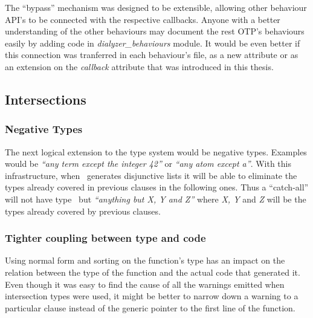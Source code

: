 The ``bypass'' mechanism was designed to be extensible, allowing other
behaviour API's to be connected with the respective callbacks. Anyone
with a better understanding of the other behaviours may document the
rest OTP's behaviours easily by adding code in
\emph{dialyzer\_behaviours} module. It would be even better if this
connection was tranferred in each behaviour's file, as a new attribute
or as an extension on the \emph{callback} attribute that was
introduced in this thesis.

\subsection{Intersections}

\subsubsection{Negative Types}
\label{sct:negative_types}

The next logical extension to the type system would be negative
types. Examples would be \emph{``any term except the integer 42''} or
\emph{``any atom except a''}. With this infrastructure, when
\dr\ generates disjunctive lists it will be able to eliminate the
types already covered in previous clauses in the following ones. Thus
a ``catch-all'' will not have type \any\ but \emph{``anything but X, Y
  and Z''} where \emph{X, Y} and \emph{Z} will be the types already
covered by previous clauses.

\subsubsection{Tighter coupling between type and code}

Using normal form and sorting on the function's type has an impact on
the relation between the type of the function and the actual code that
generated it. Even though it was easy to find the cause of all the
warnings emitted when intersection types were used, it might be better
to narrow down a warning to a particular clause instead of the generic
pointer to the first line of the function.
